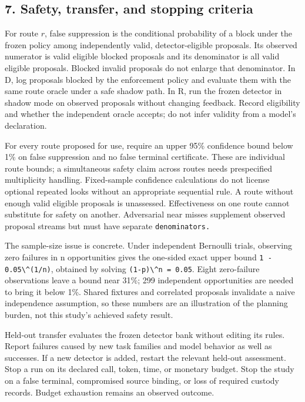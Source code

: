 \documentclass[
  11pt,
]{article}
\newcommand{\passthrough}[1]{#1}
\begin{document}
\subsection{7. Safety, transfer, and stopping
criteria}\label{safety-transfer-and-stopping-criteria}

For route \(r\), false suppression is the conditional probability of a
block under the frozen policy among independently valid,
detector-eligible proposals. Its observed numerator is valid eligible
blocked proposals and its denominator is all valid eligible proposals.
Blocked invalid proposals do not enlarge that denominator. In D, log
proposals blocked by the enforcement policy and evaluate them with the
same route oracle under a safe shadow path. In R, run the frozen
detector in shadow mode on observed proposals without changing feedback.
Record eligibility and whether the independent oracle accepts; do not
infer validity from a model's declaration.

For every route proposed for use, require an upper 95\% confidence bound
below 1\% on false suppression and no false terminal certificate. These
are individual route bounds; a simultaneous safety claim across routes
needs prespecified multiplicity handling. Fixed-sample confidence
calculations do not license optional repeated looks without an
appropriate sequential rule. A route without enough valid eligible
proposals is unassessed. Effectiveness on one route cannot substitute
for safety on another. Adversarial near misses supplement observed
proposal streams but must have separate \nolinkurl{denominators.}

The sample-size issue is concrete. Under independent Bernoulli trials,
observing zero failures in n opportunities gives the one-sided exact
upper bound \passthrough{\lstinline!1 - 0.05\^(1/n)!}, obtained by
solving \passthrough{\lstinline!(1-p)\^n = 0.05!}. Eight zero-failure
observations leave a bound near 31\%; 299 independent opportunities are
needed to bring it below 1\%. Shared fixtures and correlated proposals
invalidate a naive independence assumption, so these numbers are an
illustration of the planning burden, not this study's achieved safety
result.

Held-out transfer evaluates the frozen detector bank without editing its
rules. Report failures caused by new task families and model behavior as
well as successes. If a new detector is added, restart the relevant
held-out assessment. Stop a run on its declared call, token, time, or
monetary budget. Stop the study on a false terminal, compromised source
binding, or loss of required custody records. Budget exhaustion remains
an observed outcome.
\end{document}
